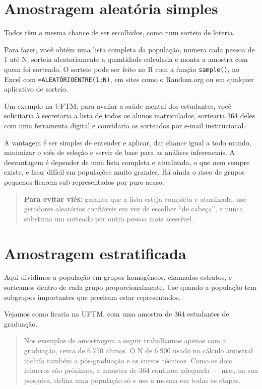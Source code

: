 \documentclass[
]{book}
\begin{document}
\section{Amostragem aleatória simples}\label{amostragem-aleatuxf3ria-simples}

Todos têm a mesma chance de ser escolhidos, como num sorteio de loteria.

Para fazer, você obtém uma lista completa da população, numera cada pessoa de 1 até N, sorteia aleatoriamente a quantidade calculada e monta a amostra com quem foi sorteado. O sorteio pode ser feito no R com a função \texttt{sample()}, no Excel com \texttt{=ALEATÓRIOENTRE(1;N)}, em sites como o Random.org ou em qualquer aplicativo de sorteio.

Um exemplo na UFTM: para avaliar a saúde mental dos estudantes, você solicitaria à secretaria a lista de todos os alunos matriculados, sortearia 364 deles com uma ferramenta digital e convidaria os sorteados por e-mail institucional.

A vantagem é ser simples de entender e aplicar, dar chance igual a todo mundo, minimizar o viés de seleção e servir de base para as análises inferenciais. A desvantagem é depender de uma lista completa e atualizada, o que nem sempre existe, e ficar difícil em populações muito grandes. Há ainda o risco de grupos pequenos ficarem sub-representados por puro acaso.

\begin{quote}
\textbf{Para evitar viés:} garanta que a lista esteja completa e atualizada, use geradores aleatórios confiáveis em vez de escolher ``de cabeça'', e nunca substitua um sorteado por outra pessoa mais acessível.
\end{quote}

\section{Amostragem estratificada}\label{amostragem-estratificada}

Aqui dividimos a população em grupos homogêneos, chamados estratos, e sorteamos dentro de cada grupo proporcionalmente. Use quando a população tem subgrupos importantes que precisam estar representados.

Vejamos como ficaria na UFTM, com uma amostra de 364 estudantes de graduação.

\begin{quote}
Nos exemplos de amostragem a seguir trabalhamos apenas com a graduação, cerca de 6.750 alunos. O N de 6.900 usado no cálculo amostral incluía também a pós-graduação e os cursos técnicos. Como os dois números são próximos, a amostra de 364 continua adequada --- mas, na sua pesquisa, defina uma população só e use a mesma em todas as etapas.
\end{quote}
\end{document}
